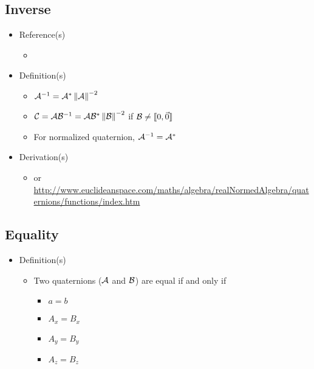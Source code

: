 \documentclass[letterpaper]{article}
\begin{document}
	\subsection{Inverse}
	\begin{itemize}
		\item Reference(s)
			\begin{itemize}
				\item \cite{Altmann1986}
			\end{itemize}
		\item Definition(s)
			\begin{itemize}
				\item $\mathcal{A}^{-1} = \mathcal{A}^\ast\left\|\mathcal{A}\right\|^{-2}$
				\item $\mathcal{C} = \mathcal{A}\mathcal{B}^{-1} = \mathcal{A}\mathcal{B}^\ast\left\|\mathcal{B}\right\|^{-2}$ if $\mathcal{B} \neq \llbracket 0, \vec{0} \rrbracket$
				\item For normalized quaternion, $\mathcal{A}^{-1} = \mathcal{A}^\ast$
			\end{itemize}
		\item Derivation(s)
			\begin{itemize}
				\item \cite{Altmann1986} or \url{http://www.euclideanspace.com/maths/algebra/realNormedAlgebra/quaternions/functions/index.htm}
			\end{itemize}
	\end{itemize}
	
	\subsection{Equality}
	\begin{itemize}
		\item Definition(s)
			\begin{itemize}
				\item Two quaternions ($\mathcal{A}$ and $\mathcal{B}$) are equal if and only if
					\begin{itemize}
						\item $a = b$
						\item $A_x = B_x$
						\item $A_y = B_y$
						\item $A_z = B_z$
					\end{itemize}
			\end{itemize}
	\end{itemize}
	
\end{document}
